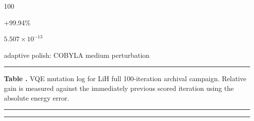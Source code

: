 \noindent\parbox[t]{0.05\linewidth}{\centering\strut 100}\hspace{0.006\linewidth}\parbox[t]{0.04\linewidth}{\centering\strut {}}\hspace{0.006\linewidth}\parbox[t]{0.10\linewidth}{\centering\strut +99.94\%}\hspace{0.006\linewidth}\parbox[t]{0.115\linewidth}{\centering\strut $5.507\times 10^{-13}$}\hspace{0.006\linewidth}\parbox[t]{0.671\linewidth}{adaptive polish: COBYLA medium perturbation}\par\smallskip
\noindent\rule{\linewidth}{0.5pt}
\par\medskip

\medskip

\label{tab:supp_vqe_log_lih}
\noindent\textbf{Table \thetable.} VQE mutation log for LiH full 100-iteration archival campaign. Relative gain is measured against the immediately previous scored iteration using the absolute energy error.
\par\medskip
\noindent\rule{\linewidth}{0.5pt}
\par\smallskip
\noindent\rule{\linewidth}{0.5pt}
\par\smallskip
